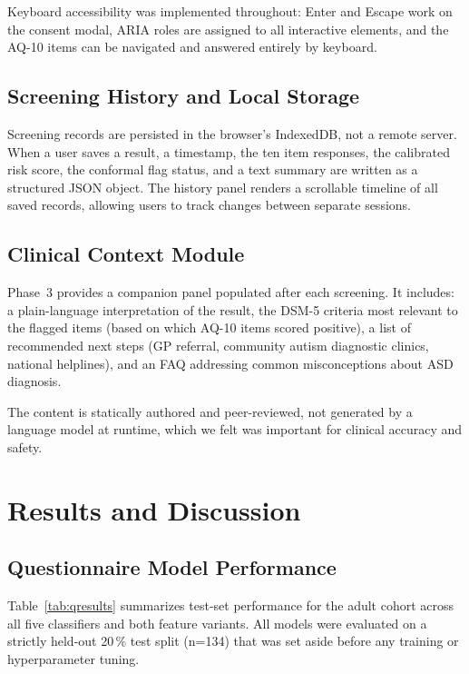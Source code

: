 \documentclass[conference]{IEEEtran}
\begin{document}
Keyboard accessibility was implemented throughout: Enter and Escape
work on the consent modal, ARIA roles are assigned to all interactive
elements, and the AQ-10 items can be navigated and answered entirely
by keyboard.

\subsection{Screening History and Local Storage}

Screening records are persisted in the browser's IndexedDB, not a
remote server. When a user saves a result, a timestamp, the ten item
responses, the calibrated risk score, the conformal flag status, and a
text summary are written as a structured JSON object. The history
panel renders a scrollable timeline of all saved records, allowing
users to track changes between separate sessions.

\subsection{Clinical Context Module}

Phase~3 provides a companion panel populated after each screening.
It includes: a plain-language interpretation of the result, the DSM-5
criteria most relevant to the flagged items (based on which AQ-10
items scored positive), a list of recommended next steps (GP referral,
community autism diagnostic clinics, national helplines), and an FAQ
addressing common misconceptions about ASD diagnosis.

The content is statically authored and peer-reviewed, not generated by
a language model at runtime, which we felt was important for clinical
accuracy and safety.

\section{Results and Discussion}

\subsection{Questionnaire Model Performance}

Table~\ref{tab:qresults} summarizes test-set performance for the adult
cohort across all five classifiers and both feature variants.
All models were evaluated on a strictly held-out 20\,\% test split
(n=134) that was set aside before any training or hyperparameter
tuning.
\end{document}
